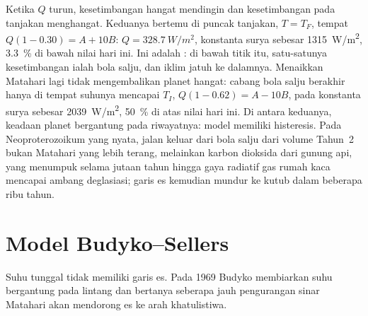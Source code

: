 \begin{omfigure}
\par{}\label{fig:b3:climate-models:zero-d}
\end{omfigure}

Ketika $Q$ turun, kesetimbangan hangat mendingin dan kesetimbangan pada tanjakan menghangat.
Keduanya bertemu di puncak tanjakan, $T = T_F$, tempat $Q(1 - 0.30) = A +
10B$: $Q = \qty{328.7}{W/m^2}$, konstanta surya sebesar \qty{1315}{W/m^2},
\qty{3.3}{\percent} di bawah nilai hari ini. Ini adalah : di bawah
titik itu, satu-satunya kesetimbangan ialah bola salju, dan iklim jatuh ke dalamnya.
Menaikkan Matahari lagi tidak mengembalikan planet hangat: cabang bola salju
berakhir hanya di tempat suhunya mencapai $T_I$, $Q(1 - 0.62) = A -
10B$, pada konstanta surya sebesar \qty{2039}{W/m^2}, \qty{50}{\percent} di atas
nilai hari ini. Di antara keduanya, keadaan planet bergantung pada riwayatnya:
model memiliki histeresis. Pada Neoproterozoikum yang nyata, jalan keluar dari
bola salju dari volume Tahun~2 bukan Matahari yang lebih terang, melainkan karbon dioksida
dari gunung api, yang menumpuk selama jutaan tahun hingga gaya
radiatif gas rumah kaca mencapai ambang deglasiasi; garis es kemudian mundur ke
kutub dalam beberapa ribu tahun.

\section{Model Budyko--Sellers}\label{sec:b3:climate-models:budyko-sellers}

Suhu tunggal tidak memiliki garis es. Pada 1969 Budyko membiarkan suhu
bergantung pada lintang dan bertanya seberapa jauh pengurangan sinar Matahari akan mendorong
es ke arah khatulistiwa.

